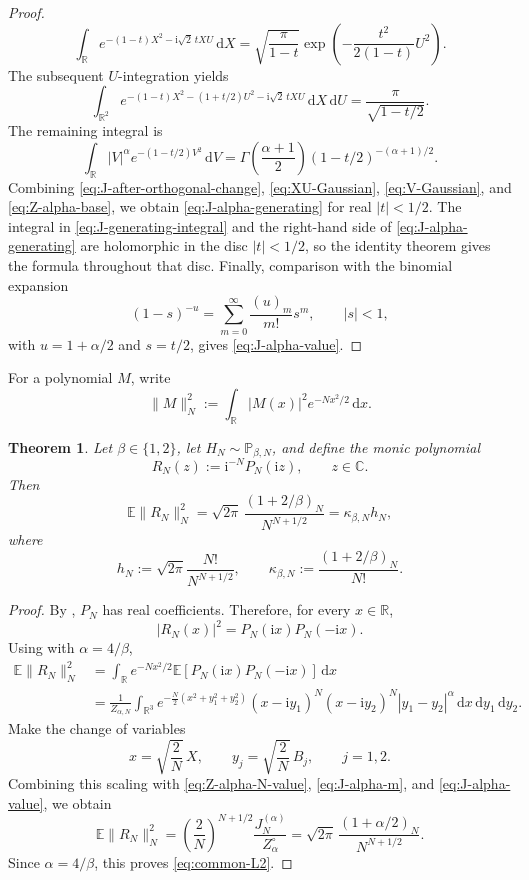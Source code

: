 \documentclass[11pt,reqno]{amsart}
\numberwithin{equation}{section}
\newtheorem{theorem}{Theorem}[section]
\theoremstyle{definition}
\theoremstyle{remark}
\newcommand{\E}{\mathbb E}
\newcommand{\Pp}{\mathbb P}
\newcommand{\R}{\mathbb R}
\newcommand{\C}{\mathbb C}
\newcommand{\1}{\mathbf 1}
\newcommand{\dd}{\mathrm d}
\newcommand{\ii}{\mathrm i}
\begin{document}
\begin{proof}
\[
  \int_{\R}
  e^{-(1-t)X^2-\ii\sqrt2\,tXU}\,\dd X
  =
  \sqrt{\frac{\pi}{1-t}}
  \exp\!\left(-\frac{t^2}{2(1-t)}U^2\right).
\]
The subsequent \(U\)-integration yields
\begin{equation}\label{eq:XU-Gaussian}
  \int_{\R^2}
  e^{-(1-t)X^2-(1+t/2)U^2-\ii\sqrt2\,tXU}
  \,\dd X\,\dd U
  =
  \frac{\pi}{\sqrt{1-t/2}}.
\end{equation}
The remaining integral is
\begin{equation}\label{eq:V-Gaussian}
  \int_{\R}|V|^\alpha e^{-(1-t/2)V^2}\,\dd V
  =
  \Gamma\!\left(\frac{\alpha+1}{2}\right)
  (1-t/2)^{-(\alpha+1)/2}.
\end{equation}
Combining \eqref{eq:J-after-orthogonal-change},
\eqref{eq:XU-Gaussian}, \eqref{eq:V-Gaussian}, and
\eqref{eq:Z-alpha-base}, we obtain \eqref{eq:J-alpha-generating} for real
\(|t|<1/2\).  The integral in \eqref{eq:J-generating-integral} and the
right-hand side of \eqref{eq:J-alpha-generating} are holomorphic in the disc
\(|t|<1/2\), so the identity theorem gives the formula throughout that disc.
Finally, comparison with the binomial expansion
\[
  (1-s)^{-u}
  =
  \sum_{m=0}^\infty\frac{(u)_m}{m!}s^m,
  \qquad |s|<1,
\]
with \(u=1+\alpha/2\) and \(s=t/2\), gives
\eqref{eq:J-alpha-value}.
\end{proof}

For a polynomial \(M\), write
\[
  \|M\|_N^2
  :=
  \int_{\R}|M(x)|^2e^{-Nx^2/2}\,\dd x.
\]

\begin{theorem}\label{thm:common-L2}
Let \(\beta\in\{1,2\}\), let \(H_N\sim\Pp_{\beta,N}\), and define the
monic polynomial
\[
  R_N(z):=\ii^{-N}P_N(\ii z),
  \qquad z\in\C.
\]
Then
\begin{equation}\label{eq:common-L2}
  \E\|R_N\|_N^2
  =
  \sqrt{2\pi}\,
  \frac{(1+2/\beta)_N}{N^{N+1/2}}
  =
  \kappa_{\beta,N}h_N,
\end{equation}
where
\[
  h_N:=\sqrt{2\pi}\frac{N!}{N^{N+1/2}},
  \qquad
  \kappa_{\beta,N}:=\frac{(1+2/\beta)_N}{N!}.
\]
\end{theorem}

\begin{proof}
By , \(P_N\) has real coefficients.  Therefore,
for every \(x\in\R\),
\[
  |R_N(x)|^2=P_N(\ii x)P_N(-\ii x).
\]
 Using
 with \(\alpha=4/\beta\), 
 \begin{align*}
  \E\|R_N\|_N^2
  &=
  \int_{\R}e^{-Nx^2/2}
  \E\!\left[P_N(\ii x)P_N(-\ii x)\right]\,\dd x\\
  &=
  \frac1{Z_{\alpha,N}}
  \int_{\R^3}
  e^{-\frac N2(x^2+y_1^2+y_2^2)}
  (x-\ii y_1)^N(x-\ii y_2)^N
  |y_1-y_2|^\alpha
  \,\dd x\,\dd y_1\,\dd y_2.
\end{align*}
Make the change of variables
\[
  x=\sqrt{\frac2N}\,X,
  \qquad
  y_j=\sqrt{\frac2N}\,B_j,
  \qquad j=1,2.
\]
Combining this scaling with \eqref{eq:Z-alpha-N-value},
\eqref{eq:J-alpha-m}, and \eqref{eq:J-alpha-value}, we obtain
\[
  \E\|R_N\|_N^2
  =
  \left(\frac2N\right)^{N+1/2}
  \frac{J_N^{(\alpha)}}{Z_\alpha^\circ}
  =
  \sqrt{2\pi}\,
  \frac{(1+\alpha/2)_N}{N^{N+1/2}}.
\]
Since \(\alpha=4/\beta\), this proves \eqref{eq:common-L2}.
\end{proof}
\end{document}

